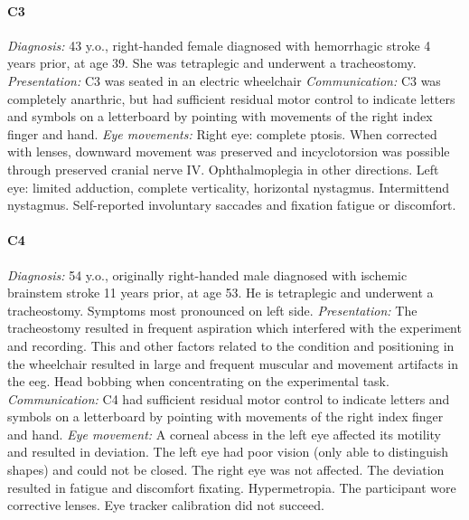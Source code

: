 \paragraph{C3}
\emph{Diagnosis:} 43 y.o., right-handed female diagnosed with hemorrhagic stroke
4 years prior, at age 39. She was tetraplegic and underwent a tracheostomy.
\emph{Presentation:} C3 was seated in an electric wheelchair
\emph{Communication:} C3 was completely anarthric, but had sufficient residual
motor control to indicate letters and symbols on a letterboard by pointing with
movements of the right index finger and hand.
\emph{Eye movements:}
Right eye: complete ptosis.
When corrected with lenses, downward movement was preserved and incyclotorsion was possible
through preserved cranial nerve IV. Ophthalmoplegia in other directions.
Left eye: limited adduction, complete verticality, horizontal nystagmus.
Intermittend nystagmus.
Self-reported involuntary saccades and fixation fatigue or discomfort.

\paragraph{C4}
\emph{Diagnosis:} 54 y.o., originally right-handed male diagnosed with ischemic brainstem
stroke 11 years prior, at age 53. He is tetraplegic and underwent a tracheostomy.
Symptoms most pronounced on left side.
\emph{Presentation:} The tracheostomy resulted in frequent aspiration which
interfered with the experiment and recording.
This and other factors related to the condition and positioning in the wheelchair
resulted in large and frequent muscular and movement artifacts in the \ac{eeg}.
Head bobbing when concentrating on the experimental task.
\emph{Communication:} C4 had sufficient residual motor control
to indicate letters and symbols on a letterboard by pointing with
movements of the right index finger and hand.
\emph{Eye movement:}
A corneal abcess in the left eye affected its motility and resulted in deviation.
The left eye had poor vision (only able to
distinguish shapes) and could not be closed.
The right eye was not affected.
The deviation resulted in fatigue and discomfort fixating.
Hypermetropia.
The participant wore corrective lenses.
Eye tracker calibration did not succeed.
